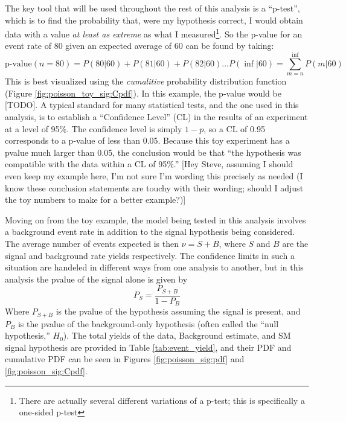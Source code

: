     The key tool that will be used throughout the rest of this analysis is a ``p-test'',
        which is to find the probability that, were my hypothesis correct,
        I would obtain data with a value \textit{at least as extreme} as what I measured\footnote{
            There are actually several different variations of a p-test;
            this is specifically a one-sided p-test}.
    So the p-value for an event rate of 80 given an expected average of 60 can be found by taking:
    \begin{equation}
        \textrm{p-value}(n=80) = P(80|60) + P(81|60) + P(82|60) ... P(\inf|60) = \sum\limits_{m=n}^\inf P(m|60)
    \end{equation}
    This is best visualized using the \textit{cumalitive} probability distribution function (Figure \ref{fig:poisson_toy_sig:Cpdf}).
    In this example, the p-value would be [TODO].
    A typical standard for many statistical tests, and the one used in this analysis,
        is to establish a ``Confidence Level'' (CL) in the results of an experiment at a level of 95\%. 
    The confidence level is simply $1-p$, so a CL of 0.95 corresponds to a p-value of less than 0.05.
    Because this toy experiment has a pvalue much larger than 0.05,
        the conclusion would be that ``the hypothesis was compatible with the data within a CL of 95\%.''
    [Hey Steve, assuming I should even keep my example here, I'm not sure I'm wording this precisely as needed 
        (I know these conclusion statements are touchy with their wording;
        should I adjust the toy numbers to make for a better example?)]


    Moving on from the toy example, the model being tested in this analysis involves a background event rate
        in addition to the signal hypothesis being considered.
    The average number of events expected is then $\nu = S + B$,
        where $S$ and $B$ are the signal and background rate yields respectively.
    The confidence limits in such a situation are handeled in different ways from one analysis to another,
        but in this analysis the pvalue of the signal alone is given by
    \begin{equation}
        P_S = \frac{P_{S+B}}{1 - P_B}
    \end{equation}
    Where $P_{S+B}$ is the pvalue of the hypothesis assuming the signal is present,
        and $P_B$ is the pvalue of the background-only hypothesis
        (often called the ``null hypothesis,'' $H_0$).
    The total yields of the data, Background estimate, and SM signal hypothesis are provided in Table \ref{tab:event_yield},
        and their PDF and cumulative PDF can be seen in
        Figures \ref{fig:poisson_sig:pdf} and \ref{fig:poisson_sig:Cpdf}.

